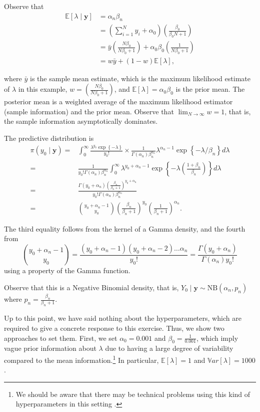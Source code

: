 Observe that 
\begin{align*}
	\mathbb{E}[\lambda\mid \mathbf{y}]&=\alpha_n\beta_n\\
	&=\left(\sum_{i=1}^N y_i + \alpha_0\right)\left(\frac{\beta_0}{\beta_0 N + 1}\right)\\
	&=\bar{y}\left(\frac{N\beta_0}{N\beta_0+1}\right)+\alpha_0\beta_0\left(\frac{1}{N\beta_0+1}\right)\\
	&=w\bar{y}+(1-w)\mathbb{E}[\lambda],
\end{align*}

where \( \bar{y} \) is the sample mean estimate, which is the maximum likelihood estimate of \( \lambda \) in this example, \( w = \left(\frac{N\beta_0}{N\beta_0 + 1}\right) \), and \( \mathbb{E}[\lambda] = \alpha_0 \beta_0 \) is the prior mean. The posterior mean is a weighted average of the maximum likelihood estimator (sample information) and the prior mean. Observe that \( \lim_{N \to \infty} w = 1 \), that is, the sample information asymptotically dominates.

The predictive distribution is
\begin{align*}
	\pi(y_0\mid \mathbf{y})=&\int_{0}^{\infty}\frac{\lambda^{y_0}\exp\left\{-\lambda\right\}}{y_0!}\times \frac{1}{\Gamma(\alpha_n)\beta_n^{\alpha_n}}\lambda^{\alpha_n-1}\exp\left\{-\lambda/\beta_n\right\} d\lambda\\
	=&\frac{1}{y_0!\Gamma(\alpha_n)\beta_n^{\alpha_n}}\int_{0}^{\infty}\lambda^{y_0+\alpha_n-1}\exp\left\{-\lambda\left(\frac{1+\beta_n}{\beta_n}\right)\right\}d\lambda\\
	=&\frac{\Gamma(y_0+\alpha_n)\left(\frac{\beta_n}{\beta_n+1}\right)^{y_0+\alpha_n}}{y_0!\Gamma(\alpha_n)\beta_n^{\alpha_n}}\\
	=&{y_0+\alpha_n-1 \choose y_0}\left(\frac{\beta_n}{\beta_n+1}\right)^{y_0}\left(\frac{1}{\beta_n+1}\right)^{\alpha_n}.
\end{align*}

The third equality follows from the kernel of a Gamma density, and the fourth from 
\[
{y_0 + \alpha_n - 1 \choose y_0} = \frac{(y_0 + \alpha_n - 1)(y_0 + \alpha_n - 2)\dots\alpha_n}{y_0!} = \frac{\Gamma(y_0 + \alpha_n)}{\Gamma(\alpha_n) y_0!}
\]
using a property of the Gamma function.

Observe that this is a Negative Binomial density, that is, \( Y_0 \mid \mathbf{y} \sim \text{NB}(\alpha_n, p_n) \) where \( p_n = \frac{\beta_n}{\beta_n + 1} \).

Up to this point, we have said nothing about the hyperparameters, which are required to give a concrete response to this exercise. Thus, we show two approaches to set them. First, we set \( \alpha_0 = 0.001 \) and \( \beta_0 = \frac{1}{0.001} \), which imply vague prior information about \( \lambda \) due to having a large degree of variability compared to the mean information.\footnote{We should be aware that there may be technical problems using this kind of hyperparameters in this setting \cite{gelman2006prior}.} In particular, \( \mathbb{E}[\lambda] = 1 \) and \( \mathbb{V}ar[\lambda] = 1000 \).

